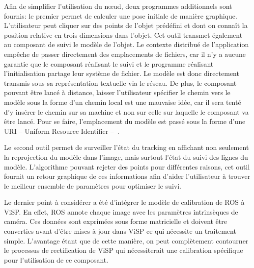 Afin de simplifier l'utilisation du n\oe ud, deux programmes
additionnels sont fournis: le premier permet de calculer une pose
initiale de manière graphique. L'utilisateur peut cliquer sur des
points de l'objet prédéfini et dont on connaît la position relative en
trois dimensions dans l'objet. Cet outil transmet également au
composant de suivi le modèle de l'objet. Le contexte distribué de
l'application empêche de passer directement des emplacements de
fichiers, car il n'y a aucune garantie que le composant réalisant le
suivi et le programme réalisant l'initialisation partage leur système
de fichier. Le modèle est donc directement transmis sous sa
représentation textuelle via le réseau. De plus, le composant pouvant
être lancé à distance, laisser l'utilisateur spécifier le chemin vers
le modèle sous la forme d'un chemin local est une mauvaise idée, car
il sera tenté d'y insérer le chemin sur sa machine et non sur celle
sur laquelle le composant va être lancé. Pour se faire, l'emplacement
du modèle est passé sous la forme d'une URI -- Uniform Resource
Identifier -- \citep{rfc2396}.


Le second outil permet de surveiller l'état du tracking en affichant
non seulement la reprojection du modèle dans l'image, mais surtout
l'état du suivi des lignes du modèle. L'algorithme pouvant rejeter des
points pour différentes raisons, cet outil fournit un retour graphique
de ces informations afin d'aider l'utilisateur à trouver le meilleur
ensemble de paramètres pour optimiser le suivi.


Le dernier point à considérer a été d'intégrer le modèle de
calibration de ROS à ViSP. En effet, ROS annote chaque image avec les
paramètres intrinsèques de caméra. Ces données sont exprimées sous
forme matricielle et doivent être converties avant d'être mises à jour
dans ViSP ce qui nécessite un traitement simple. L'avantage étant que
de cette manière, on peut complètement contourner le processus de
rectification de ViSP qui nécessiterait une calibration spécifique
pour l'utilisation de ce composant.


